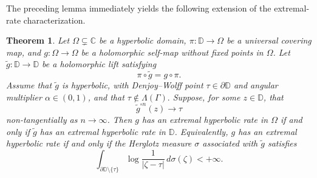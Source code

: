 \documentclass[12pt]{amsart}
\numberwithin{equation}{section}
\theoremstyle{plain}
\newtheorem{theorem}[equation]{Theorem}
\theoremstyle{definition}
\begin{document}
The preceding lemma immediately yields the following extension of the
extremal-rate characterization.

\begin{theorem}
\label{thm:multiply_connected}
Let $\Omega\subsetneq\mathbb C$ be a hyperbolic domain,
$\pi:\mathbb D\to\Omega$ be a universal covering map, and
$g:\Omega\to\Omega$ be a holomorphic self-map without fixed points in
$\Omega$. Let
$\widetilde g:\mathbb D\to\mathbb D$
be a holomorphic lift satisfying
\begin{equation}
\label{eq:lift_relation}
\pi\circ\widetilde g=g\circ\pi.
\end{equation}
Assume that $\widetilde g$ is hyperbolic, with Denjoy--Wolff point
$\tau\in\partial\mathbb D$ and angular multiplier
$\alpha\in(0,1)$, and that
$\tau\notin\Lambda(\Gamma).$
Suppose, for some $z\in\mathbb D$, that
\begin{equation*}
\widetilde g^{\circ n}(z)\longrightarrow\tau
\end{equation*}
non-tangentially as $n\to\infty$. Then $g$ has an extremal hyperbolic
rate in $\Omega$ if and only if $\widetilde g$ has an extremal
hyperbolic rate in $\mathbb D$. Equivalently, $g$ has an extremal
hyperbolic rate if and only if the Herglotz measure $\sigma$ associated
with $\widetilde g$ satisfies
\begin{equation}
\label{eq:multiply_extremal_condition}
\int_{\partial\mathbb D\setminus\{\tau\}}
\log\frac{1}{|\zeta-\tau|}
\,d\sigma(\zeta)
<+\infty.
\end{equation}
\end{theorem}
\end{document}
